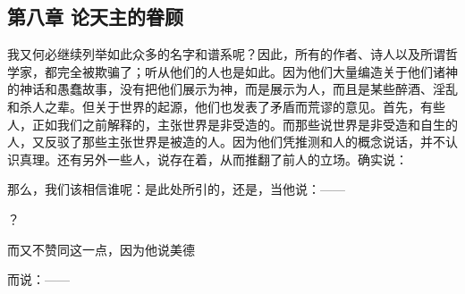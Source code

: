 \subsection{第八章 论天主的眷顾}

我又何必继续列举如此众多的名字和谱系呢？因此，所有的作者、诗人以及所谓哲学家，都完全被欺骗了；听从他们的人也是如此。因为他们大量编造关于他们诸神的神话和愚蠢故事，没有把他们展示为神，而是展示为人，而且是某些醉酒、淫乱和杀人之辈。但关于世界的起源，他们也发表了矛盾而荒谬的意见。首先，有些人，正如我们之前解释的，主张世界是非受造的。而那些说世界是非受造和自生的人，又反驳了那些主张世界是被造的人。因为他们凭推测和人的概念说话，并不认识真理。还有另外一些人，说存在着，从而推翻了前人的立场。确实说：\par

\par

那么，我们该相信谁呢：是此处所引的，还是，当他说：——\par

？\par

而又不赞同这一点，因为他说美德\par

\par

而说：——\par

\par

